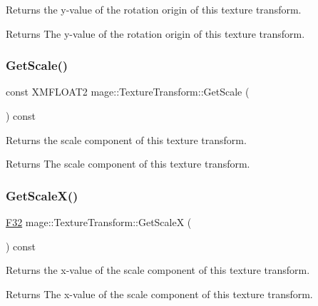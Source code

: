 Returns the y-\/value of the rotation origin of this texture transform.

\begin{DoxyReturn}{Returns}
The y-\/value of the rotation origin of this texture transform. 
\end{DoxyReturn}
\hypertarget{classmage_1_1_texture_transform_a4d6465ef615e8f1fd3b85541892313c8}{}\label{classmage_1_1_texture_transform_a4d6465ef615e8f1fd3b85541892313c8} 
\subsubsection{\texorpdfstring{Get\+Scale()}{GetScale()}}
{\footnotesize\ttfamily const X\+M\+F\+L\+O\+A\+T2 mage\+::\+Texture\+Transform\+::\+Get\+Scale (\begin{DoxyParamCaption}{ }\end{DoxyParamCaption}) const\hspace{0.3cm}{\ttfamily [noexcept]}}

Returns the scale component of this texture transform.

\begin{DoxyReturn}{Returns}
The scale component of this texture transform. 
\end{DoxyReturn}
\hypertarget{classmage_1_1_texture_transform_a8aba9997f667007fb9b77e14031a1f00}{}\label{classmage_1_1_texture_transform_a8aba9997f667007fb9b77e14031a1f00} 
\subsubsection{\texorpdfstring{Get\+Scale\+X()}{GetScaleX()}}
{\footnotesize\ttfamily \hyperlink{namespacemage_aa97e833b45f06d60a0a9c4fc22ae02c0}{F32} mage\+::\+Texture\+Transform\+::\+Get\+ScaleX (\begin{DoxyParamCaption}{ }\end{DoxyParamCaption}) const\hspace{0.3cm}{\ttfamily [noexcept]}}

Returns the x-\/value of the scale component of this texture transform.

\begin{DoxyReturn}{Returns}
The x-\/value of the scale component of this texture transform. 
\end{DoxyReturn}
\hypertarget{classmage_1_1_texture_transform_a06a3314cef041f0070f7203e1538a2eb}{}\label{classmage_1_1_texture_transform_a06a3314cef041f0070f7203e1538a2eb} 
